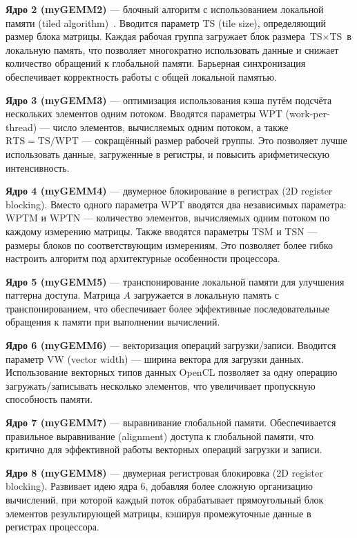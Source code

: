 \textbf{Ядро 2 (myGEMM2)} --- блочный алгоритм с использованием локальной памяти (tiled algorithm)~\cite{goto2008anatomy}. Вводится параметр $\text{TS}$ (tile size), определяющий размер блока матрицы. Каждая рабочая группа загружает блок размера $\text{TS} \times \text{TS}$ в локальную память, что позволяет многократно использовать данные и снижает количество обращений к глобальной памяти. Барьерная синхронизация обеспечивает корректность работы с общей локальной памятью.

\textbf{Ядро 3 (myGEMM3)} --- оптимизация использования кэша путём подсчёта нескольких элементов одним потоком. Вводятся параметры $\text{WPT}$ (work-per-thread) --- число элементов, вычисляемых одним потоком, а также $\text{RTS} = \text{TS}/\text{WPT}$ --- сокращённый размер рабочей группы. Это позволяет лучше использовать данные, загруженные в регистры, и повысить арифметическую интенсивность.

\textbf{Ядро 4 (myGEMM4)} --- двумерное блокирование в регистрах (2D register blocking). Вместо одного параметра $\text{WPT}$ вводятся два независимых параметра: $\text{WPTM}$ и $\text{WPTN}$ --- количество элементов, вычисляемых одним потоком по каждому измерению матрицы. Также вводятся параметры $\text{TSM}$ и $\text{TSN}$ --- размеры блоков по соответствующим измерениям. Это позволяет более гибко настроить алгоритм под архитектурные особенности процессора.

\textbf{Ядро 5 (myGEMM5)} --- транспонирование локальной памяти для улучшения паттерна доступа. Матрица $A$ загружается в локальную память с транспонированием, что обеспечивает более эффективные последовательные обращения к памяти при выполнении вычислений.

\textbf{Ядро 6 (myGEMM6)} --- векторизация операций загрузки/записи. Вводится параметр $\text{VW}$ (vector width) --- ширина вектора для загрузки данных. Использование векторных типов данных OpenCL позволяет за одну операцию загружать/записывать несколько элементов, что увеличивает пропускную способность памяти.

\textbf{Ядро 7 (myGEMM7)} --- выравнивание глобальной памяти. Обеспечивается правильное выравнивание (alignment) доступа к глобальной памяти, что критично для эффективной работы векторных операций загрузки и записи.

\textbf{Ядро 8 (myGEMM8)} --- двумерная регистровая блокировка (2D register blocking). Развивает идею ядра 6, добавляя более сложную организацию вычислений, при которой каждый поток обрабатывает прямоугольный блок элементов результирующей матрицы, кэшируя промежуточные данные в регистрах процессора.

